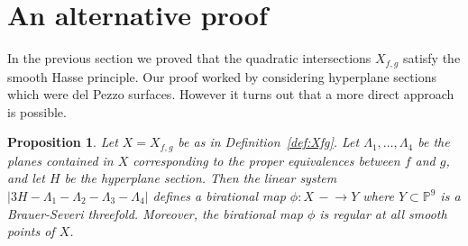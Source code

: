 \documentclass[12pt]{amsart}
\newcommand{\PP}{{\mathbb P}}
\newtheorem{Proposition}{Proposition}[section]
\theoremstyle{definition}
\begin{document}
\section{An alternative proof}
\label{sec:bs}

In the previous section we proved that the quadratic intersections
$X_{f,g}$ satisfy the smooth Hasse principle. Our proof worked by
considering hyperplane sections which were del Pezzo surfaces. However
it turns out that a more direct approach is possible.

\begin{Proposition}
  \label{prop:bs}
  Let $X = X_{f,g}$ be as in Definition~\ref{def:Xfg}. Let
  $\Lambda_1, \ldots, \Lambda_4$ be the planes contained in $X$
  corresponding to the proper equivalences between $f$ and $g$, and
  let $H$ be the hyperplane section. Then the linear system
  $|3 H - \Lambda_1 - \Lambda_2 - \Lambda_3 - \Lambda_4|$ defines a
  birational map $\phi : X \, - \!  \to Y$ where $Y \subset \PP^9$ is
  a Brauer-Severi threefold. Moreover, the birational map $\phi$ is
  regular at all smooth points of $X$.
\end{Proposition}
\end{document}
